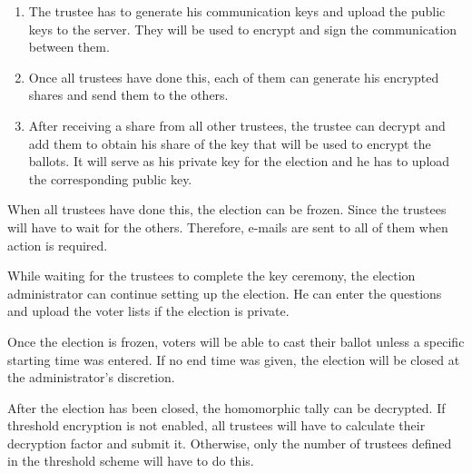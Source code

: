 \begin{enumerate}
  \item The trustee has to generate his communication keys and upload the public keys to the server. They will be used to encrypt and sign the communication between them.
  \item Once all trustees have done this, each of them can generate his encrypted shares and send them to the others.
  \item After receiving a share from all other trustees, the trustee can decrypt and add them to obtain his share of the key that will be used to encrypt the ballots. It will serve as his private key for the election and he has to upload the corresponding public key.
\end{enumerate}

\par When all trustees have done this, the election can be frozen. Since the trustees will have to wait for the others. Therefore, e-mails are sent to all of them when action is required.

\par While waiting for the trustees to complete the key ceremony, the election administrator can continue setting up the election. He can enter the questions and upload the voter lists if the election is private.

\par Once the election is frozen, voters will be able to cast their ballot unless a specific starting time was entered. If no end time was given, the election will be closed at the administrator's discretion.

\par After the election has been closed, the homomorphic tally can be decrypted. If threshold encryption is not enabled, all trustees will have to calculate their decryption factor and submit it. Otherwise, only the number of trustees defined in the threshold scheme will have to do this.
